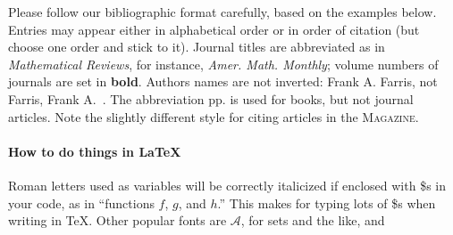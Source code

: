 \documentclass[12pt]{article}
\begin{document}
Please follow our bibliographic format carefully, based
on the examples below.  Entries may appear either in alphabetical
order or in order of citation (but choose one order and
stick to it).   Journal titles are abbreviated
as in \emph{Mathematical Reviews},
for instance, \textit{Amer. Math. Monthly}; volume numbers
of journals are set in \textbf{bold}.  Authors names are
not inverted: Frank A. Farris, not Farris, Frank A.~\cite{Farris}.
The abbreviation pp. is used for books, but not journal
articles.  Note the slightly different style for
citing articles in the \textsc{Magazine}.


\paragraph*{How to do things in \LaTeX}

Roman letters used as variables will be correctly
italicized if enclosed with \$s in your code, as in ``functions $f$, $g$, and $h$.''
This makes for typing lots of \$s when writing in \TeX.
Other popular fonts are $\mathcal A$, for sets and the like, and\cite{adams1995hitchhiker}


\end{document}
